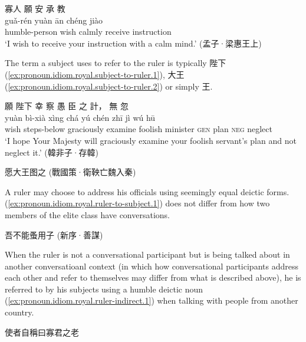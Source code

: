 \documentclass[UTF8, a4paper, oneside, scheme=plain, 12pt]{ctexrep}
\newcommand{\translate}[1]{`#1'}
\newcommand*{\category}[1]{\textsc{#1}}
\begin{document}
\begin{exe}
    \ex\label{ex:pronoun.idiom.royal.king-self-reference.1}
    \glll 寡人 願 安 承 教 \\
    guǎ-rén yuàn ān chéng jiào \\
    humble-person wish calmly receive instruction \\
    \glt\translate{I wish to receive your instruction with a calm mind.} \hfill (孟子·梁惠王上)
\end{exe}

The term a subject uses to refer to the ruler is typically 陛下 (\ref{ex:pronoun.idiom.royal.subject-to-ruler.1}), 大王 (\ref{ex:pronoun.idiom.royal.subject-to-ruler.2}) or simply 王.

\begin{exe}
    \ex\label{ex:pronoun.idiom.royal.subject-to-ruler.1}
    \glll 願 陛下 幸 察 愚 臣 之 計， 無 忽 \\
    yuàn bì-xià xìng chá yú chén zhī jì wú hū \\
    wish steps-below graciously examine foolish minister \category{gen} plan \category{neg} neglect \\
    \glt\translate{I hope Your Majesty will graciously examine your foolish servant's plan and not neglect it.} \hfill (韓非子·存韓)

    \ex\label{ex:pronoun.idiom.royal.subject-to-ruler.2}
    愿大王图之 \hfill (戰國策·衛鞅亡魏入秦)
\end{exe}

A ruler may choose to address his officials using seemingly equal deictic forms.
(\ref{ex:pronoun.idiom.royal.ruler-to-subject.1}) does not differ from how two members of the elite class have conversations.


\begin{exe}
    \ex\label{ex:pronoun.idiom.royal.ruler-to-subject.1} 吾不能蚤用子 \hfill (新序·善謀)
\end{exe}

When the ruler is not a conversational participant but is being talked about in another conversatioanl context
(in which how conversational participants address each other and refer to themselves may differ from what is described above),
he is referred to by his subjects using a humble deictic noun (\ref{ex:pronoun.idiom.royal.ruler-indirect.1}) when talking with people from another country.

\begin{exe}
    \ex\label{ex:pronoun.idiom.royal.ruler-indirect.1} 使者自稱曰寡君之老
\end{exe}
\end{document}

